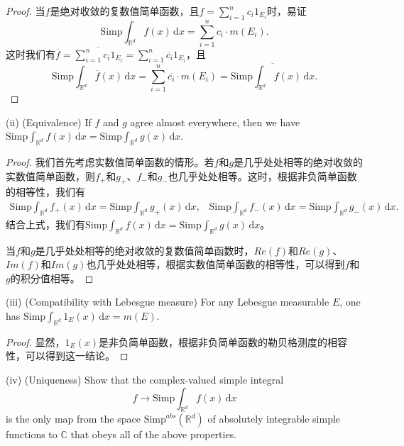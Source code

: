 \documentclass[reqno,a4paper,14pt]{amsart}
\newcommand\dif{\,\mathrm{d}}
\begin{document}
\begin{proof}
    当$f$是绝对收敛的复数值简单函数，且$f=\sum_{i=1}^n c_i 1_{E_i}$时，易证
    \begin{equation}
        \mathrm{Simp}\int_{\mathbb{R}^d}  f(x)\dif x = \sum_{i=1}^n c_i \cdot m(E_i).
        \label{Uniqueness}
    \end{equation}
    这时我们有$\overline{f}=\overline{\sum_{i=1}^nc_i 1_{E_i}}=\sum_{i=1}^n \overline{c_i}1_{E_i}$，且
    \begin{equation*}
        \mathrm{Simp} \int_{\mathbb{R}^d} \overline{f}(x)\dif x = \sum_{i=1}^n \overline{c_i}\cdot m(E_i)=\overline{\mathrm{Simp}\int_{\mathbb{R}^d} f(x)\dif x}.
    \end{equation*}
\end{proof}
(ii) (Equivalence) If $f$ and $g$ agree almost everywhere, then we have \\$\mathrm{Simp}\int_{\mathbb{R}^d} f(x)\dif x=\mathrm{Simp}\int_{\mathbb{R}^d} g(x)\dif x$.
\begin{proof}
    我们首先考虑实数值简单函数的情形。若$f$和$g$是几乎处处相等的绝对收敛的实数值简单函数，则$f_+$和$g_+$、$f_-$和$g_-$也几乎处处相等。这时，根据非负简单函数的相等性，我们有
    \begin{equation*}
        \begin{split}
            \mathrm{Simp}\int_{\mathbb{R}^d} f_+(x)\dif x = \mathrm{Simp}\int_{\mathbb{R}^d} g_+(x)\dif x,\;\;\;\mathrm{Simp}\int_{\mathbb{R}^d} f_-(x)\dif x = \mathrm{Simp}\int_{\mathbb{R}^d} g_-(x)\dif x.
        \end{split}
    \end{equation*}
    结合上式，我们有$\mathrm{Simp}\int_{\mathbb{R}^d} f(x)\dif x=\mathrm{Simp}\int_{\mathbb{R}^d} g(x)\dif x$。
    
    当$f$和$g$是几乎处处相等的绝对收敛的复数值简单函数时，$Re(f)$和$Re(g)$、$Im(f)$和$Im(g)$也几乎处处相等，根据实数值简单函数的相等性，可以得到$f$和$g$的积分值相等。
\end{proof}
(iii) (Compatibility with Lebesgue measure) For any Lebesgue measurable $E$, one has $\mathrm{Simp} \int_{\mathbb{R}^d} 1_{E}(x)\dif x=m(E)$.
\begin{proof}
    显然，$1_{E}(x)$是非负简单函数，根据非负简单函数的勒贝格测度的相容性，可以得到这一结论。
\end{proof}
(iv) (Uniqueness) Show that the complex-valued simple integral 
\begin{equation*}
    f \to \mathrm{Simp} \int_{\mathbb{R}^d} f(x) \dif x
\end{equation*}
is the only map from the space $\mathrm{Simp}^{abs}(\mathbb{R}^d)$ of absolutely integrable simple functions to $\mathbb{C}$ that obeys all of the above properties.
\end{document}
